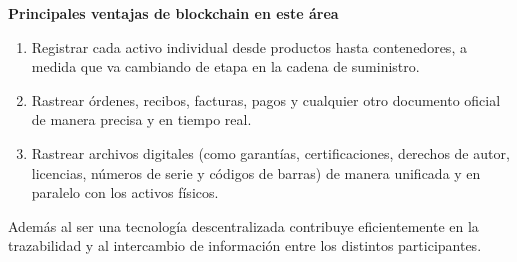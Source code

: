  \textbf{Principales ventajas de blockchain en este área}
 \begin{enumerate}
    \item Registrar cada activo individual desde productos hasta contenedores, a medida que va cambiando de etapa en la cadena de suministro.
    \item Rastrear órdenes, recibos, facturas, pagos y cualquier otro documento oficial de manera precisa y en tiempo real.
    \item Rastrear archivos digitales (como garantías, certificaciones, derechos de autor, licencias, números de serie y códigos de barras) de manera unificada y en paralelo con los activos físicos.
 \end{enumerate}
Además al ser una tecnología descentralizada contribuye eficientemente en la trazabilidad y al intercambio de información entre los distintos participantes.

